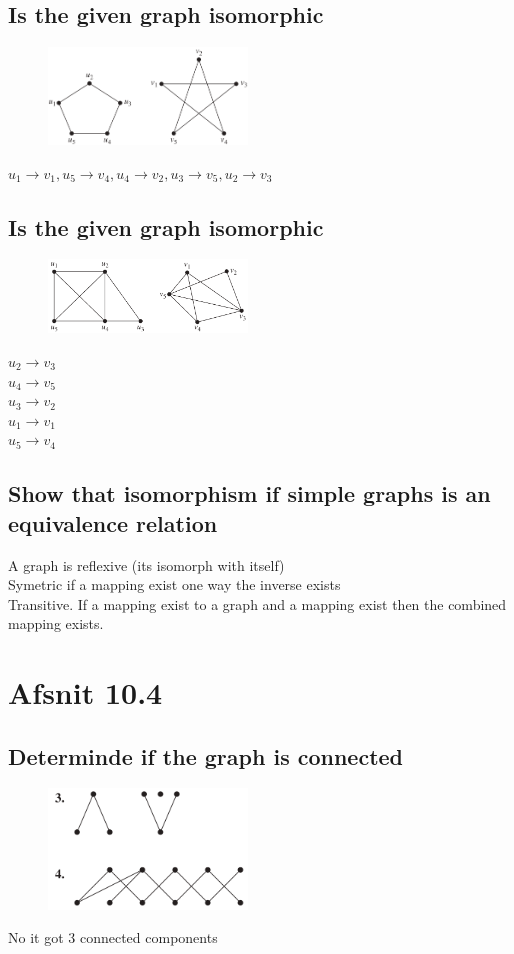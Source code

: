\documentclass[12pt, a4paper]{report}
\begin{document}
		\subsection{Is the given graph isomorphic}
			\begin{figure}[h!]
				\centering
				\includegraphics[width=200px]{assets/10,3,39.png}
				\label{}
				\caption{}
			\end{figure}
			$u_1\rightarrow v_1,u_5\rightarrow v_4,u_4\rightarrow v_2,u_3\rightarrow v_5, u_2\rightarrow v_3$
		\setcounter{subsection}{41}
		\subsection{Is the given graph isomorphic}
			\begin{figure}[h!]
				\centering
				\includegraphics[width=200px]{assets/10,3,42.png}
				\label{}
				\caption{}
			\end{figure}
		 	$u_2\rightarrow v_3$\\
			$u_4\rightarrow v_5$\\
			$u_3\rightarrow v_2$\\
			$u_1\rightarrow v_1$\\
			$u_5\rightarrow v_4$
		\setcounter{subsection}{48}
		\subsection{Show that isomorphism if simple graphs is an equivalence relation}
			A graph is reflexive (its isomorph with itself)\\
			Symetric if a mapping exist one way the inverse exists\\
			Transitive. If a mapping exist to a graph and a mapping exist then the combined mapping exists.
	\section{Afsnit 10.4}
		\setcounter{subsection}{2}
		\subsection{Determinde if the graph is connected}
			\begin{figure}[h!]
				\centering
			\includegraphics[width=200px]{assets/10,4,3-4.png}
				\label{}
				\caption{}
			\end{figure}
			No it got 3 connected components
\end{document}
